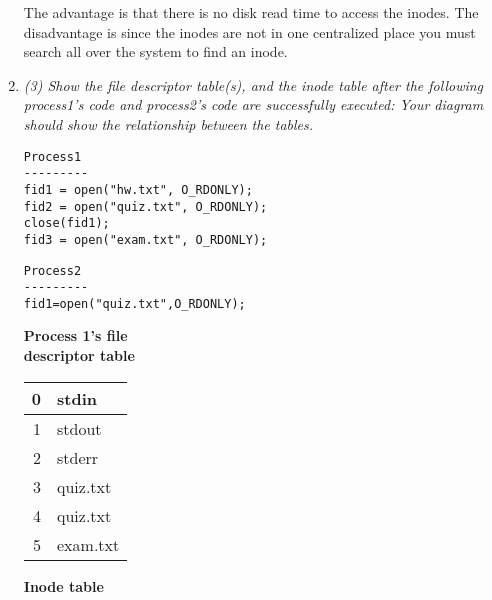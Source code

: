 \documentclass[letterpaper,11pt]{article}
\begin{document}
\begin{enumerate}
The advantage is that there is no disk read time to access the inodes.  The disadvantage is since the inodes are not in one centralized place you must search all over the system to find an inode.
\item \emph{(3) Show the file descriptor table(s), and the inode table after the following process1's code and process2's code are successfully executed: Your diagram should show the relationship between the tables.}

\begin{minipage}[t]{0.45\textwidth}
\begin{verbatim}
Process1 
--------- 
fid1 = open("hw.txt", O_RDONLY);
fid2 = open("quiz.txt", O_RDONLY);
close(fid1);
fid3 = open("exam.txt", O_RDONLY);
\end{verbatim}
\end{minipage}
\begin{minipage}[t]{0.45\textwidth}
\begin{verbatim}
Process2
---------
fid1=open("quiz.txt",O_RDONLY);
\end{verbatim}
\end{minipage}

\begin{minipage}[t]{0.3\textwidth}
\begin{center}
\textbf{Process 1's file \\ descriptor table}

  \begin{tabular}{|r | l |}
    \hline
    0 & stdin \\ \hline
    1 & stdout  \\ \hline
    2 & stderr \\ \hline
    3 & quiz.txt \\ \hline
    4 & quiz.txt \\ \hline
    5 & exam.txt \\ \hline
  \end{tabular}
\end{center}
\end{minipage}
\begin{minipage}[t]{0.3\textwidth}
\begin{center}
\textbf{Inode table}


\end{center}
\end{minipage}
\end{enumerate}
\end{document}
